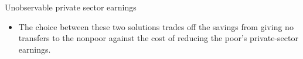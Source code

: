 \documentclass{beamer}
\begin{document}
\begin{frame}[allowframebreaks]{Unobservable private sector earnings }
\begin{itemize}
PROPOSITION 2: If both income-generating abilities and incomes are unobservable, one of the following two PAP's is cost minimizing: 
\begin{enumerate}
    \item (welfare) impose no work requirements and offer both ability groups a transfer
 of $z - y(0, a_L)$
 \item  (ii) (workfare) offer self-categorized high-ability individuals no benefits and offer self-categorized low-ability individuals a transfer of $z - y(0, a_L)$ and require them to work $c^s_L$. 
\end{enumerate}
\item The choice between these two solutions trades off the savings from giving no
transfers to the nonpoor against the cost of
reducing the poor's private-sector earnings.
\end{itemize}


\end{frame}
\end{document}
